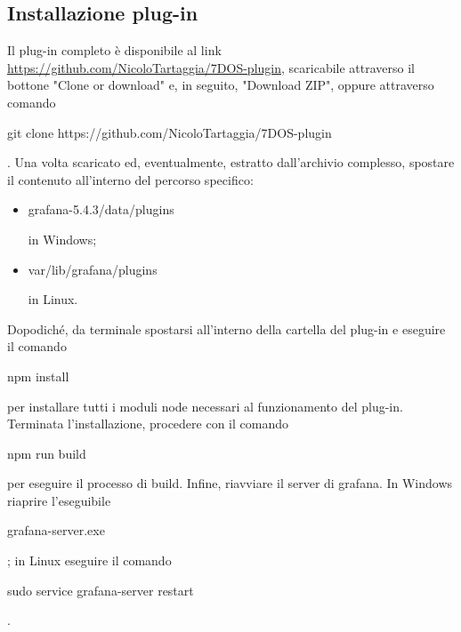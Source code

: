 \subsection{Installazione plug-in}
Il plug-in completo è disponibile al link \url{https://github.com/NicoloTartaggia/7DOS-plugin}, scaricabile attraverso il bottone "Clone or download" e, in seguito, "Download ZIP", oppure attraverso comando \begin{ttfamily}git clone https://github.com/NicoloTartaggia/7DOS-plugin\end{ttfamily}. Una volta scaricato ed, eventualmente, estratto dall'archivio complesso, spostare il contenuto all'interno del percorso specifico: 
\begin{itemize}
	\item{\begin{ttfamily}grafana-5.4.3/data/plugins\end{ttfamily}} in Windows; \item{\begin{ttfamily}var/lib/grafana/plugins\end{ttfamily} in Linux.}
\end{itemize}
Dopodiché, da terminale spostarsi all'interno della cartella del plug-in e eseguire il comando \begin{ttfamily}npm install\end{ttfamily} per installare tutti i moduli node necessari al funzionamento del plug-in. Terminata l'installazione, procedere con il comando \begin{ttfamily}npm run build\end{ttfamily} per eseguire il processo di build. 
Infine, riavviare il server di grafana. In Windows riaprire l'eseguibile \begin{ttfamily}grafana-server.exe\end{ttfamily}; in Linux eseguire il comando \begin{ttfamily}sudo service grafana-server restart\end{ttfamily}.

